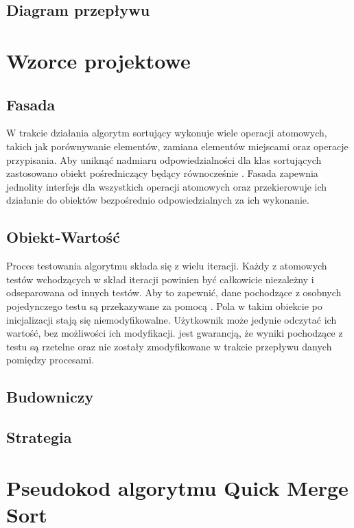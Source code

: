 \subsection{Diagram przepływu}

\section{Wzorce projektowe}

\subsection{Fasada}
W trakcie działania algorytm sortujący wykonuje wiele operacji atomowych, takich jak porównywanie
elementów, zamiana elementów miejscami oraz operacje przypisania. Aby uniknąć nadmiaru odpowiedzialności
dla klas sortujących zastosowano obiekt pośredniczący  będący równocześnie .
Fasada zapewnia jednolity interfejs dla wszystkich operacji atomowych oraz przekierowuje ich działanie
do obiektów bezpośrednio odpowiedzialnych za ich wykonanie.

\begin{figure}[H]
	\centering
	
\end{figure}

\subsection{Obiekt-Wartość}
Proces testowania algorytmu składa się z wielu iteracji. Każdy z atomowych testów wchodzących w skład
iteracji powinien być całkowicie niezależny i odseparowana od innych testów. Aby to zapewnić, dane pochodzące
z osobnych pojedynczego testu są przekazywane za pomocą . Pola w takim obiekcie po
inicjalizacji stają się niemodyfikowalne. Użytkownik może jedynie odczytać ich wartość, bez możliwości ich modyfikacji.  jest gwarancją, że wyniki pochodzące z testu są rzetelne oraz nie zostały
zmodyfikowane w trakcie przepływu danych pomiędzy procesami.

\begin{figure}[H]
	\centering
	
\end{figure}

\subsection{Budowniczy}

\subsection{Strategia}

\section{Pseudokod algorytmu Quick Merge Sort}
